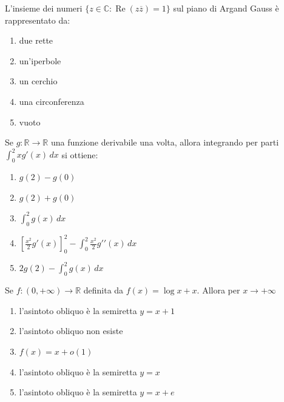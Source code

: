 \begin{quiz}
L’insieme dei numeri $\{z\in\mathbb C:\operatorname{Re}(z\overline z)=1\}$ sul piano di Argand Gauss è rappresentato da:

\begin{enumerate}
\item due rette
\item un’iperbole
\item un cerchio
\item una circonferenza
\item vuoto
\end{enumerate}
\end{quiz}

\begin{quiz}
Se $g:\mathbb R\to\mathbb R$ una funzione derivabile una volta, allora integrando per parti $\displaystyle\int_0^2 xg'(x)\,dx$ si ottiene:

\begin{enumerate}
\item $g(2)-g(0)$
\item $g(2)+g(0)$
\item $\int_0^2 g(x)\,dx$
\item $\left[\frac{x^2}{2}g\prime(x)\right]_0^2-\int_0^2\frac{x^2}{2}g\prime\prime(x)\,dx$
\item $2g(2)-\int_0^2 g(x)\,dx$
\end{enumerate}
\end{quiz}

\begin{quiz}
Se $f:(0,+\infty)\to\mathbb R$ definita da $f(x)=\log x+x$. Allora per $x\to+\infty$

\begin{enumerate}
\item l’asintoto obliquo è la semiretta $y=x+1$
\item l’asintoto obliquo non esiste
\item $f(x)=x+o(1)$
\item l’asintoto obliquo è la semiretta $y=x$
\item l’asintoto obliquo è la semiretta $y=x+e$
\end{enumerate}
\end{quiz}

